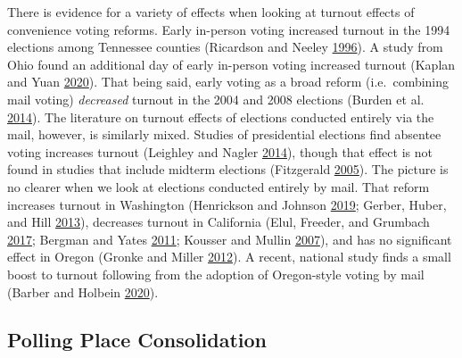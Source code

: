\documentclass[
  12pt,
]{article}
\begin{document}
There is evidence for a variety of effects when looking at turnout effects of convenience voting reforms. Early in-person voting increased turnout in the 1994 elections among Tennessee counties (Ricardson and Neeley \protect\hyperlink{ref-Ricardson1996}{1996}). A study from Ohio found an additional day of early in-person voting increased turnout (Kaplan and Yuan \protect\hyperlink{ref-Kaplan2020}{2020}). That being said, early voting as a broad reform (i.e.~combining mail voting) \emph{decreased} turnout in the 2004 and 2008 elections (Burden et al. \protect\hyperlink{ref-Burden2014}{2014}). The literature on turnout effects of elections conducted entirely via the mail, however, is similarly mixed. Studies of presidential elections find absentee voting increases turnout (Leighley and Nagler \protect\hyperlink{ref-Leighley2014}{2014}), though that effect is not found in studies that include midterm elections (Fitzgerald \protect\hyperlink{ref-Fitzgerald2005}{2005}). The picture is no clearer when we look at elections conducted entirely by mail. That reform increases turnout in Washington (Henrickson and Johnson \protect\hyperlink{ref-Henrickson2019}{2019}; Gerber, Huber, and Hill \protect\hyperlink{ref-Gerber2013}{2013}), decreases turnout in California (Elul, Freeder, and Grumbach \protect\hyperlink{ref-Elul2017}{2017}; Bergman and Yates \protect\hyperlink{ref-Bergman2011}{2011}; Kousser and Mullin \protect\hyperlink{ref-Kousser2007}{2007}), and has no significant effect in Oregon (Gronke and Miller \protect\hyperlink{ref-Gronke2012}{2012}). A recent, national study finds a small boost to turnout following from the adoption of Oregon-style voting by mail (Barber and Holbein \protect\hyperlink{ref-Barber2020}{2020}).

\hypertarget{polling-place-consolidation}{%
\subsection*{Polling Place Consolidation}\label{polling-place-consolidation}}
\end{document}
